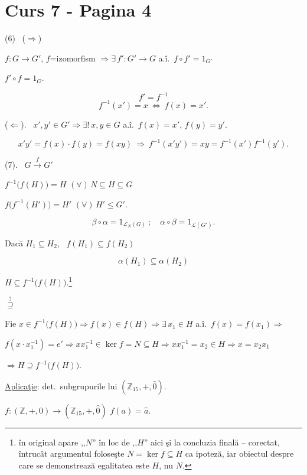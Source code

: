 \section*{Curs 7 - Pagina 4}

\noindent (6) \ ($\Rightarrow$)

\noindent $f:G\to G'$, $f$=izomorfism $\Rightarrow \exists\,f':G'\to G$ a.î.\ $f\circ f'=1_{G'}$

\noindent $f'\circ f=1_G$.

\[
f'=f^{-1}
\]
\[
f^{-1}(x')=x \ \Leftrightarrow \ f(x)=x'.
\]

\bigskip
\noindent ($\Leftarrow$). \ $x',y'\in G' \Rightarrow \exists!\,x,y\in G$ a.î.\ $f(x)=x'$, $f(y)=y'$.

\[
x'y' = f(x)\cdot f(y) = f(xy) \ \Rightarrow \ f^{-1}(x'y') = xy = f^{-1}(x')f^{-1}(y').
\]

\bigskip
\noindent (7). \ $G \xrightarrow{f} G'$

\noindent $f^{-1}\big(f(H)\big)= H$ \quad $(\forall)\,N\subseteq H\subseteq G$

\noindent $f\big(f^{-1}(H')\big) = H'$ \quad $(\forall)\,H'\leq G'$.

\[
\beta\circ\alpha = 1_{\mathcal{L}_N(G)} \ ; \quad \alpha\circ\beta = 1_{\mathcal{L}(G')}.
\]

\bigskip
\noindent Dacă $H_1\subseteq H_2$, \ $f(H_1)\subseteq f(H_2)$

\[
\alpha(H_1) \subseteq \alpha(H_2)
\]

\bigskip
\noindent $H\subseteq f^{-1}\big(f(H)\big)$.\footnote{în original apare ,,$N$'' în loc de ,,$H$'' aici şi la concluzia finală -- corectat, întrucât argumentul foloseşte $N=\ker f\subseteq H$ ca ipoteză, iar obiectul despre care se demonstrează egalitatea este $H$, nu $N$.}

\noindent $\overset{?}{\supseteq}$

\noindent Fie $x\in f^{-1}\big(f(H)\big) \Rightarrow f(x)\in f(H) \Rightarrow \exists\,x_1\in H$ a.î.\ $f(x)=f(x_1) \Rightarrow$

\noindent $f(x\cdot x_1^{-1}) = e' \Rightarrow xx_1^{-1}\in\ker f = N\subseteq H \Rightarrow xx_1^{-1} = x_2\in H \Rightarrow x=x_2x_1$

\noindent $\Rightarrow H\supseteq f^{-1}\big(f(H)\big)$.

\bigskip
\noindent\underline{Aplicaţie}: det.\ subgrupurile lui $(\mathbb{Z}_{15},+,\hat 0)$.

\noindent $f:(\mathbb{Z},+,0) \to (\mathbb{Z}_{15},+,\hat 0)$ \quad $f(a)=\hat a$.

